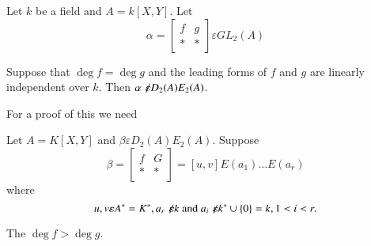 \begin{Prop}\label{c1:Prop3.3}
Let $k$ be a field and $A=k[X,Y]$. Let 
$$
\alpha=
\begin{bmatrix}
f & g\\
\ast & \ast
\end{bmatrix} \varepsilon GL_2(A)
$$

Suppose that $\deg f=\deg g$ and the leading forms of $f$ and $g$ are
linearly independent over $k$. Then $\alpha \not\kern-2pt\varepsilon D_2(A)E_2(A)$. 

For a proof of this we need
\end{Prop}

\begin{lem}\label{c1:lem3.4}
Let $A=K[X,Y]$ and $\beta \varepsilon D_2(A)E_2(A)$. Suppose
$$
\beta=\begin{bmatrix}
f & G\\
\ast & \ast
\end{bmatrix} = [u, v]E(a_1)\ldots E(a_r)
$$
where
$$
u,v \varepsilon A^{\ast}=K^{\ast}, a_r \not\kern-2pt\varepsilon k\text{ and }a_i\not\kern-2pt\varepsilon
k^{\ast} \cup \{0\}=k, 1<i<r.
$$

The $\deg f> \deg g$.
\end{lem}

